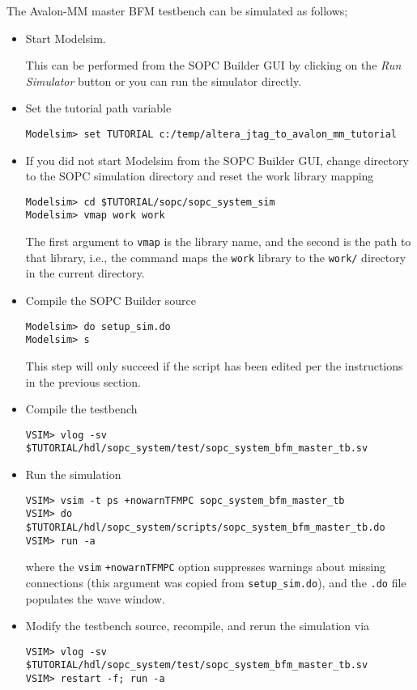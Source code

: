 \documentclass[10pt,twoside]{article}
\begin{document}
The Avalon-MM master BFM testbench can be simulated as follows;
%
\begin{itemize}
\item Start Modelsim.

This can be performed from the SOPC Builder GUI by clicking on
the {\em Run Simulator} button or you can run the simulator directly.

\item Set the tutorial path variable
%
\begin{verbatim}
Modelsim> set TUTORIAL c:/temp/altera_jtag_to_avalon_mm_tutorial
\end{verbatim}
%
\item If you did not start Modelsim from the SOPC Builder GUI,
change directory to the SOPC simulation directory and reset the
work library mapping
%
\begin{verbatim}
Modelsim> cd $TUTORIAL/sopc/sopc_system_sim
Modelsim> vmap work work
\end{verbatim}
%
The first argument to \verb+vmap+ is the library name, and
the second is the path to that library, i.e., the command
maps the \verb+work+ library to the \verb+work/+
directory in the current directory.
%
\item Compile the SOPC Builder source
%
\begin{verbatim}
Modelsim> do setup_sim.do
Modelsim> s
\end{verbatim}
%
This step will only succeed if the script has been edited per
the instructions in the previous section.
%
\item Compile the testbench
%
\begin{verbatim}
VSIM> vlog -sv $TUTORIAL/hdl/sopc_system/test/sopc_system_bfm_master_tb.sv
\end{verbatim}
%
\item Run the simulation 
%
\begin{verbatim}
VSIM> vsim -t ps +nowarnTFMPC sopc_system_bfm_master_tb
VSIM> do $TUTORIAL/hdl/sopc_system/scripts/sopc_system_bfm_master_tb.do
VSIM> run -a
\end{verbatim}
%
where the \verb+vsim+ \verb|+nowarnTFMPC| option suppresses warnings 
about missing connections (this argument was copied from \verb+setup_sim.do+),
and the \verb+.do+ file populates the wave window.
%
\item Modify the testbench source, recompile, and rerun the simulation via
%
\begin{verbatim}
VSIM> vlog -sv $TUTORIAL/hdl/sopc_system/test/sopc_system_bfm_master_tb.sv
VSIM> restart -f; run -a
\end{verbatim}
%
\end{itemize}
\end{document}
